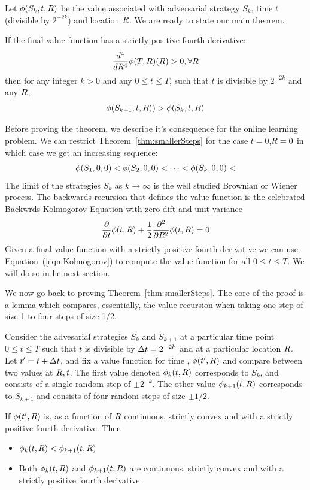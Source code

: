 \documentclass{article}[12pt]
\begin{document}
Let $\phi(S_k,t,R)$ be the value associated with adversarial
strategy $S_k$, time $t$ (divisible by $2^{-2k}$) and
location $R$. We are ready to state our main theorem.

\begin{theorem}\label{thm:smallerSteps}
  If the final value function has a strictly positive fourth
  derivative:
  $$ \frac{d^4}{d R^4} \phi(T,R)(R) >0, \forall R$$
  then for any integer $k>0$ and any $0 \leq  t \leq T$, such that $t$
  is divisible by
  $2^{-2k}$ and any $R$,
  $$\phi(S_{k+1},t,R)) >  \phi(S_{k},t,R)$$
\end{theorem}

Before proving the theorem, we describe it's
consequence for the online learning problem.
We can restrict Theorem~\ref{thm:smallerSteps} for the
case $t=0$,$R=0$ in which case we get an increasing sequence:
\[
\phi(S_1,0,0) < \phi(S_2,0,0) <\cdots <\phi(S_k,0,0) <
\]
The limit of the strategies $S_k$ as $k \to \infty$ is the well
studied Brownian or Wiener process. The backwards recursion that
defines the value function is the celebrated Backwrds Kolmogorov
Equation with zero dift and unit variance
\begin{equation} \label{eqn:Kolmogorov}
  \frac{\partial}{\partial t} \phi(t,R)
  + \frac{1}{2} \frac{\partial^2}{\partial R^2} \phi(t,R)=0
\end{equation}
Given a final value function with a strictly positive fourth
derivative we can use Equation~(\ref{eqn:Kolmogorov}) to compute the
value function for all $0 \leq t \leq T$. We will do so in he next section.

We now go back to proving Theorem~\ref{thm:smallerSteps}. The core of
the proof is a lemma which compares, essentially, the value recursion
when taking one step of size 1 to four steps of size 1/2.


Consider the advesarial strategies $S_k$ and $S_{k+1}$ at a particular
time point $0 \leq t \leq T$ such that $t$ is divisible by
$\Delta t=2^{-2k}$ and at a particular location $R$. Let
$t'=t+\Delta t$, and fix a value
function for time , $\phi(t',R)$ and compare between
two values at $R,t$. The first value denoted
$\phi_k(t,R)$ corresponds to $S_k$, and consists of a single random step of $\pm 2^{-k}$. 
The other value $\phi_{k+1}(t,R)$ corresponds to $S_{k+1}$ and consists of
four random steps of size $\pm 1/2$.

\begin{lemma} \label{lemma:n-strictly-convex}
If $\phi(t',R)$ is, as a function of $R$ continuous, strictly
convex and with a strictly positive fourth derivative. Then
\begin{itemize}
\item $\phi_k(t,R) < \phi_{k+1}(t,R)$
  \item Both $\phi_k(t,R)$ and $\phi_{k+1}(t,R)$ are continuous, strictly
convex and with a strictly positive fourth derivative.
\end{itemize}
\end{lemma}
\end{document}
